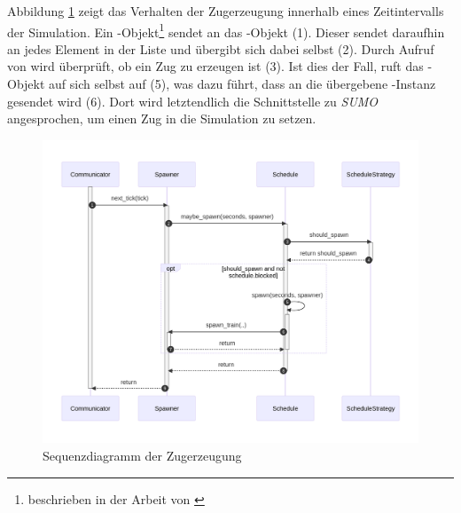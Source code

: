Abbildung \ref{fig:spawner-seq} zeigt das Verhalten der Zugerzeugung innerhalb eines Zeitintervalls der Simulation. Ein -Objekt\footnote{beschrieben in der Arbeit von \citeauthor{kamp_architektur_2023}\cite{kamp_architektur_2023}} sendet  an das -Objekt (1). Dieser sendet daraufhin  an jedes Element in der Liste  und übergibt sich dabei selbst (2). Durch Aufruf von  wird überprüft, ob ein Zug zu erzeugen ist (3). Ist dies der Fall, ruft das -Objekt auf sich selbst  auf (5), was dazu führt, dass  an die übergebene -Instanz gesendet wird (6). Dort wird letztendlich die Schnittstelle zu \emph{SUMO} angesprochen, um einen Zug in die Simulation zu setzen.

\begin{figure}[H]
	\centering
	\includegraphics[width=1.0\linewidth]{images/diagrams/spawner-seq.png}
	\caption{Sequenzdiagramm der Zugerzeugung}
	\label{fig:spawner-seq}
\end{figure}

